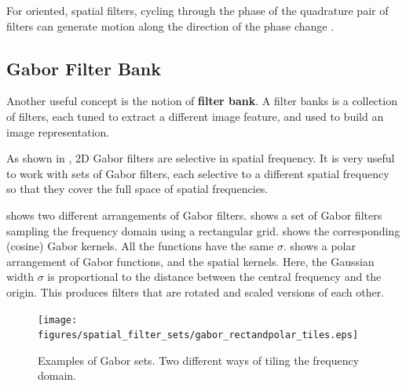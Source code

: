 For oriented, spatial filters, cycling through the phase of the
quadrature pair of filters can generate motion along the direction of
the phase change \cite{Freeman91b}.  %






\subsection{Gabor Filter Bank}

Another useful concept is the notion of {\bf filter bank}.
A filter banks is a collection of filters, each tuned to extract a different image feature, and used to build an image representation.


As shown in \fig{\ref{fig:gabor_ft}}, 2D Gabor filters are selective in spatial frequency. It is very useful to work with sets of Gabor filters, each selective to a different spatial frequency so that they cover the full space of spatial frequencies.

\Fig{\ref{fig:gabor_rectandpolar_tiles}} shows two different arrangements of Gabor filters.  shows a set of Gabor filters sampling the frequency domain using a rectangular grid.  shows the corresponding (cosine) Gabor kernels. All the functions have the same $\sigma$.  shows a polar arrangement of Gabor functions, and  the spatial kernels. Here, the Gaussian width $\sigma$ is proportional to the distance between the central frequency and the origin. This produces filters that are rotated and scaled versions of each other.

\begin{figure}[t]
	\centerline{
		\texttt{[image: figures/spatial\_filter\_sets/gabor\_rectandpolar\_tiles.eps]} }
	\caption{Examples of Gabor sets. Two different ways of tiling the frequency domain.}
	\label{fig:gabor_rectandpolar_tiles}
\end{figure}

